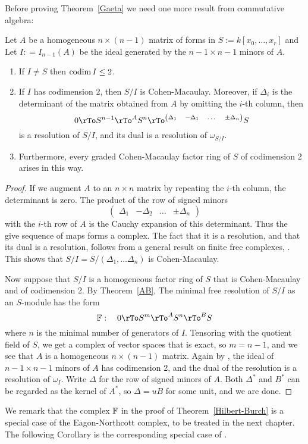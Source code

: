 Before proving Theorem~\ref{Gaeta} we need one more result from commutative algebra:

\begin{theorem}\label{Hilbert-Burch}
Let $A$ be a homogeneous $n\times (n-1)$ matrix of forms in $S := k[x_{0},\dots, x_{r}]$ and
Let  $I: = I_{n-1}(A)$ be the ideal generated by the $n-1\times n-1$ minors of $A$.
\begin{enumerate}
 
\item If $I \neq S$ then $\operatorname{codim} I \leq 2$.
 \item If $I$ has codimension 2, then
$S/I$ is Cohen-Macaulay. Moreover, if $\Delta_{i}$ is the determinant of the matrix obtained
from $A$ by omitting the $i$-th column, then 
$$
0\rTo S^{n-1} \rTo^{A} S^{n}\rTo^{\scriptsize
\begin{pmatrix}
 \Delta_{1}& -\Delta_{1}&\dots&\pm \Delta_{n}
\end{pmatrix}}
S
$$
is a resolution of $S/I$, and its dual is a resolution of $\omega_{S/I}$.
\item Furthermore, every graded Cohen-Macaulay factor ring of $S$ of codimension 2
arises in this way.
\end{enumerate}
\end{theorem}

\begin{proof}
If we augment $A$ to an $n\times n$ matrix by repeating the $i$-th column, the determinant is zero.
The product of the row of signed minors 
$$\begin{pmatrix}
 \Delta_{1}& -\Delta_{2}&\dots&\pm \Delta_{n}
\end{pmatrix}
$$ 
with the $i$-th row of $A$ is the Cauchy expansion of this determinant. Thus the give sequence of maps
forms a complex. The fact that it is a resolution, and that its dual is a resolution, follows from a general result on finite free complexes,
\cite[Theorem *****]{Eisenbud95}. This shows that $S/I = S/(\Delta_{1}, \dots \Delta_{n})$ is Cohen-Macaulay.

Now suppose that $S/I$ is a homogeneous factor ring of $S$ that is Cohen-Macaulay and of codimension 2.
By Theorem~\ref{AB}, The minimal free resolution of $S/I$ as an $S$-module has the form 
$$
\FF: \quad 0\rTo S^{m} \rTo^{A} S^{n} \rTo^{B} S
$$
where $n$ is the minimal number of generators of $I$. Tensoring with the quotient field of $S$, we
get a complex of vector spaces that is exact, so $m = n-1$, and we see that $A$ is a homogeneous
$n\times (n-1)$ matrix. Again by \cite[Theorem *****]{Eisenbud95}, the ideal of $n-1\times n-1$ minors of $A$ has
codimension 2, and the dual of the resolution is a resolution of $\omega_{I}$. Write $\Delta$ for the
row of signed minors of $A$. Both $\Delta^*$ and $B^*$ can be regarded as the kernel of $A^*$,
so $\Delta = uB$ for some unit, and we are done.
\end{proof}
We remark that the complex ${\mathbb F}$ in the proof of Theorem~\ref{Hilbert-Burch} is a special case of the Eagon-Northcott complex,
to be treated in the next chapter. The following Corollary is the corresponding special case of 
\cite[Theorem ***]{MR476736}.

